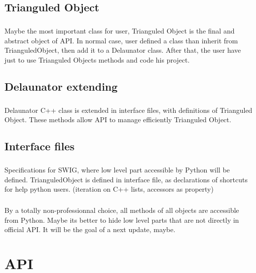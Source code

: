 \documentclass{report}
\begin{document}
\section{Trianguled Object}
    \paragraph*{}
    Maybe the most important class for user, Trianguled Object is the final and abstract object of API. 
    In normal case, user defined a class than inherit from TrianguledObject, then add it to a Delaunator class.
    After that, the user have just to use Trianguled Objects methods and code his project.


\section{Delaunator extending}
    \paragraph*{}
    Delaunator C++ class is extended in interface files, with definitions of Trianguled Object. 
    These methods allow API to manage efficiently Trianguled Object.


\section{Interface files}
    \paragraph*{}
    Specifications for SWIG, where low level part accessible by Python will be defined.
    TrianguledObject is defined in interface file, as declarations of shortcuts for help python users. (iteration on C++ lists, accessors as property)
    \paragraph*{}
    By a totally non-professionnal choice, all methods of all objects are accessible from Python.
    Maybe its better to hide low level parts that are not directly in official API. It will be the goal of a next update, maybe.
    





\chapter{API}
\end{document}

